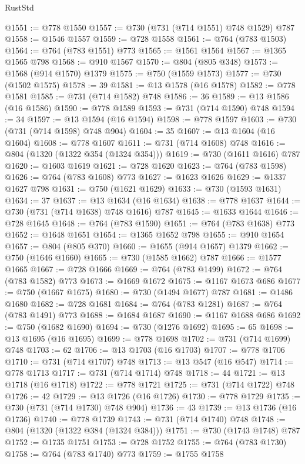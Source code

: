 \begin{lexlean}{RustStd}
\begin{coremodule}
@1551 := @778 @1550
@1557 := @730 (@731 (@714 @1551) @748 @1529) @787
@1558 := @1546 @1557
@1559 := @728 @1558
@1561 := @764 (@783 @1503)
@1564 := @764 (@783 @1551) @773
@1565 := @1561 @1564
@1567 := @1365 @1565 @798
@1568 := @910 @1567
@1570 := @804 (@805 @348)
@1573 := @1568 (@914 @1570) @1379
@1575 := @750 (@1559 @1573)
@1577 := @730 (@1502 @1575)
@1578 := 39
@1581 := @13 @1578 (@16 @1578)
@1582 := @778 @1581
@1585 := @731 (@714 @1582) @748
@1586 := 36
@1589 := @13 @1586 (@16 @1586)
@1590 := @778 @1589
@1593 := @731 (@714 @1590) @748
@1594 := 34
@1597 := @13 @1594 (@16 @1594)
@1598 := @778 @1597
@1603 := @730 (@731 (@714 @1598) @748 @904)
@1604 := 35
@1607 := @13 @1604 (@16 @1604)
@1608 := @778 @1607
@1611 := @731 (@714 @1608) @748
@1616 := @804 (@1320 (@1322 @354 (@1324 @354)))
@1619 := @730 (@1611 @1616) @787
@1620 := @1603 @1619
@1621 := @728 @1620
@1623 := @764 (@783 @1598)
@1626 := @764 (@783 @1608) @773
@1627 := @1623 @1626
@1629 := @1337 @1627 @798
@1631 := @750 (@1621 @1629)
@1633 := @730 (@1593 @1631)
@1634 := 37
@1637 := @13 @1634 (@16 @1634)
@1638 := @778 @1637
@1644 := @730 (@731 (@714 @1638) @748 @1616) @787
@1645 := @1633 @1644
@1646 := @728 @1645
@1648 := @764 (@783 @1590)
@1651 := @764 (@783 @1638) @773
@1652 := @1648 @1651
@1654 := @1365 @1652 @798
@1655 := @910 @1654
@1657 := @804 (@805 @370)
@1660 := @1655 (@914 @1657) @1379
@1662 := @750 (@1646 @1660)
@1665 := @730 (@1585 @1662) @787
@1666 := @1577 @1665
@1667 := @728 @1666
@1669 := @764 (@783 @1499)
@1672 := @764 (@783 @1582) @773
@1673 := @1669 @1672
@1675 := @1167 @1673 @686
@1677 := @750 (@1667 @1675)
@1680 := @730 (@1494 @1677) @787
@1681 := @1486 @1680
@1682 := @728 @1681
@1684 := @764 (@783 @1281)
@1687 := @764 (@783 @1491) @773
@1688 := @1684 @1687
@1690 := @1167 @1688 @686
@1692 := @750 (@1682 @1690)
@1694 := @730 (@1276 @1692)
@1695 := 65
@1698 := @13 @1695 (@16 @1695)
@1699 := @778 @1698
@1702 := @731 (@714 @1699) @748
@1703 := 62
@1706 := @13 @1703 (@16 @1703)
@1707 := @778 @1706
@1710 := @731 (@714 @1707) @748
@1713 := @13 @547 (@16 @547)
@1714 := @778 @1713
@1717 := @731 (@714 @1714) @748
@1718 := 44
@1721 := @13 @1718 (@16 @1718)
@1722 := @778 @1721
@1725 := @731 (@714 @1722) @748
@1726 := 42
@1729 := @13 @1726 (@16 @1726)
@1730 := @778 @1729
@1735 := @730 (@731 (@714 @1730) @748 @904)
@1736 := 43
@1739 := @13 @1736 (@16 @1736)
@1740 := @778 @1739
@1743 := @731 (@714 @1740) @748
@1748 := @804 (@1320 (@1322 @384 (@1324 @384)))
@1751 := @730 (@1743 @1748) @787
@1752 := @1735 @1751
@1753 := @728 @1752
@1755 := @764 (@783 @1730)
@1758 := @764 (@783 @1740) @773
@1759 := @1755 @1758

\end{coremodule}
\end{lexlean}
